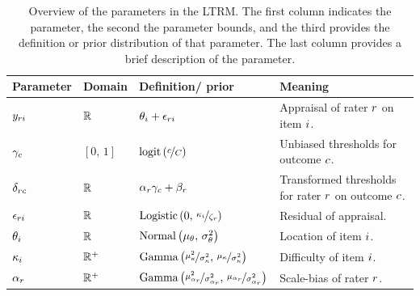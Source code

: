 \documentclass[a4paper,usenames,dvipsnames]{article}
\newenvironment{revision}{\color{black}}{\color{black}}
\begin{document}
\protect\begin{revision}

	\begin{table}[!ht]

	\centering
	\caption{\protect\begin{revision}Overview of the parameters in the LTRM. The first column indicates the parameter, the second the parameter bounds, and the third provides the definition or prior distribution of that parameter. The last column provides a brief description of the parameter.\protect\end{revision}}%

	\label{tb:LTRMparameterOverview}

	\begin{tabular}{llll}

	\toprule

	Parameter & Domain & Definition/ prior & Meaning\\

	\midrule

	$y_{ri}		$&$	\mathbb{R}			$&$\theta_i + \epsilon_{ri}$&
	\makecell[l]{Appraisal of rater $r$\\on item $i$.}\\

	$\gamma_c 		$&$	[0,\,1]			$&$\logit{\nicefrac{\Incat}{\Tncat}}$&
	\makecell[l]{Unbiased thresholds for\\outcome $c$.}\\

	$\delta_{rc} 	$&$	\mathbb{R}			$&$\alpha_r \gamma_c + \beta_r$&
	\makecell[l]{Transformed thresholds\\for rater $r$ on outcome $c$.}\\

	$\epsilon_{ri}   		$&$	\mathbb{R}			$&$\text{Logistic}\left(0,\,\nicefrac{\kappa_i}{\zeta_r}\right) $&
	Residual of appraisal.\\

	$\theta_i        		$&$	\mathbb{R}			$&$\text{Normal}\left(\mu_\theta,\,\sigma_\theta^2\right)$&
	Location of item $i$.\\

	$\kappa_i   		$&$	\mathbb{R}^+	$&$\text{Gamma}\left(\nicefrac{\mu_\kappa^2}{\sigma_\kappa^2},\,\nicefrac{\mu_\kappa}{\sigma_\kappa^2}\right) $&
	Difficulty of item $i$.\\

	$\alpha_r      		$&$	\mathbb{R}^+	$&$\text{Gamma}\left(\nicefrac{\mu_{\alpha_r}^2}{\sigma_{\alpha_r}^2},\,\nicefrac{\mu_{\alpha_r}}{\sigma_{\alpha_r}^2}\right) $&
	Scale-bias of rater $r$.\\


\end{tabular}
\end{table}
\end{revision}
\end{document}
